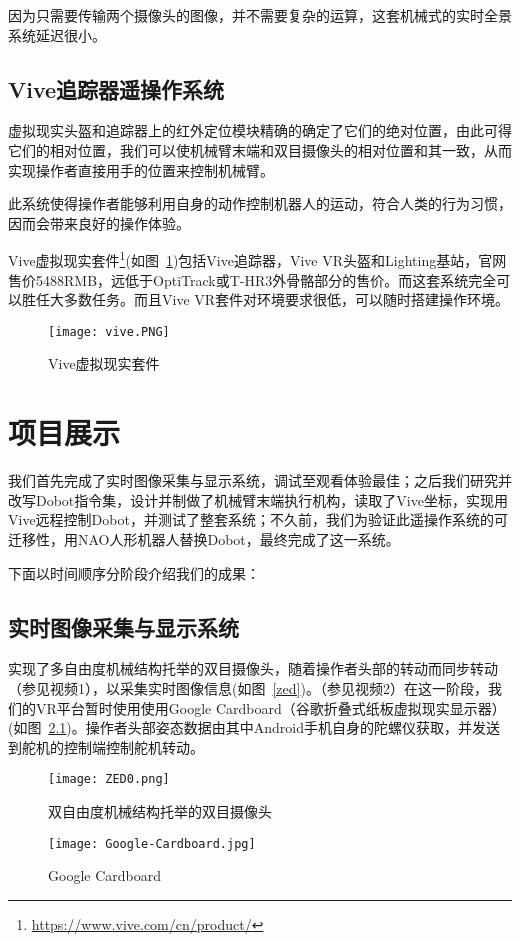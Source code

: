 因为只需要传输两个摄像头的图像，并不需要复杂的运算，这套机械式的实时全景系统延迟很小。

\section{Vive追踪器遥操作系统}

虚拟现实头盔和追踪器上的红外定位模块精确的确定了它们的绝对位置，由此可得它们的相对位置，我们可以使机械臂末端和双目摄像头的相对位置和其一致，从而实现操作者直接用手的位置来控制机械臂。

此系统使得操作者能够利用自身的动作控制机器人的运动，符合人类的行为习惯，因而会带来良好的操作体验。

Vive虚拟现实套件\footnote{\url{https://www.vive.com/cn/product/}}(如图~\ref{vivekit})包括Vive追踪器，Vive VR头盔和Lighting基站，官网售价5488RMB，远低于OptiTrack或T-HR3外骨骼部分的售价。而这套系统完全可以胜任大多数任务。而且Vive VR套件对环境要求很低，可以随时搭建操作环境。
\begin{figure}[H]
\small
\centering
\texttt{[image: vive.PNG]}
\caption{Vive虚拟现实套件} 
\label{vivekit}
\end{figure}

\chapter{项目展示}

我们首先完成了实时图像采集与显示系统，调试至观看体验最佳；之后我们研究并改写Dobot指令集，设计并制做了机械臂末端执行机构，读取了Vive坐标，实现用Vive远程控制Dobot，并测试了整套系统；不久前，我们为验证此遥操作系统的可迁移性，用NAO人形机器人替换Dobot，最终完成了这一系统。

下面以时间顺序分阶段介绍我们的成果：

\section{实时图像采集与显示系统}
实现了多自由度机械结构托举的双目摄像头，随着操作者头部的转动而同步转动{\kaishu （参见视频1）}，以采集实时图像信息(如图~\ref{zed})。{\kaishu （参见视频2）}在这一阶段，我们的VR平台暂时使用使用Google Cardboard（谷歌折叠式纸板虚拟现实显示器）(如图~\ref{card})。操作者头部姿态数据由其中Android手机自身的陀螺仪获取，并发送到舵机的控制端控制舵机转动。

\begin{figure}
\begin{minipage}{0.48\textwidth}
  \centering
  \texttt{[image: ZED0.png]}
  \caption{双自由度机械结构托举的双目摄像头}
  \label{zed}
\end{minipage}\hfill
\begin{minipage}{0.48\textwidth}
  \centering
  \texttt{[image: Google-Cardboard.jpg]}
  \caption{Google Cardboard}
  \label{card}
\end{minipage}
\end{figure}

